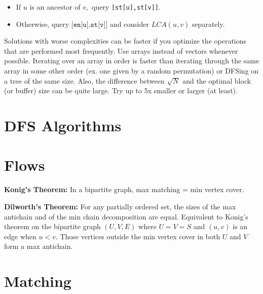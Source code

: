 		\begin{itemize}
		\item If $u$ is an ancestor of $v,$ query \texttt{[st[u],st[v]]}.
		\item Otherwise, query $\texttt{[en[u],st[v]]}$ and consider $LCA(u,v)$ separately.
		\end{itemize}

		Solutions with worse complexities can be faster if you optimize the operations that are performed most frequently. Use arrays instead of vectors whenever possible. Iterating over an array in order is faster than iterating through the same array in some other order (ex. one given by a random permutation) or DFSing on a tree of the same size. Also, the difference between $\sqrt N$ and the optimal block (or buffer) size can be quite large. Try up to 5x smaller or larger (at least).


\section{DFS Algorithms}


\section{Flows}

	\textbf{Konig's Theorem:} In a bipartite graph, max matching = min vertex cover.

	\textbf{Dilworth's Theorem:} For any partially ordered set, the sizes of the max antichain and of the min chain decomposition are equal. Equivalent to Konig's theorem on the bipartite graph $(U,V,E)$ where $U=V=S$ and $(u,v)$ is an edge when $u<v$. Those vertices outside the min vertex cover in both $U$ and $V$ form a max antichain.




\section{Matching}

